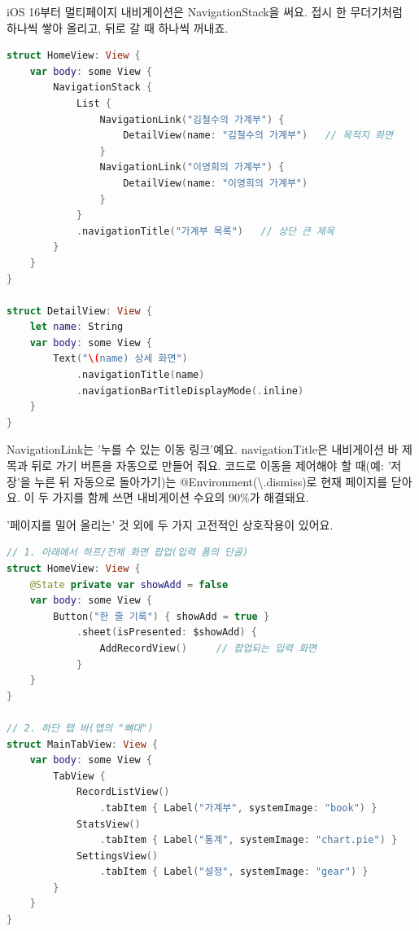
iOS 16부터 멀티페이지 내비게이션은 NavigationStack을 써요. 접시 한 무더기처럼 하나씩 쌓아 올리고, 뒤로 갈 때 하나씩 꺼내죠.

\begin{lstlisting}[language=Swift]
struct HomeView: View {
    var body: some View {
        NavigationStack {
            List {
                NavigationLink("김철수의 가계부") {
                    DetailView(name: "김철수의 가계부")   // 목적지 화면
                }
                NavigationLink("이영희의 가계부") {
                    DetailView(name: "이영희의 가계부")
                }
            }
            .navigationTitle("가계부 목록")   // 상단 큰 제목
        }
    }
}

struct DetailView: View {
    let name: String
    var body: some View {
        Text("\(name) 상세 화면")
            .navigationTitle(name)
            .navigationBarTitleDisplayMode(.inline)
    }
}
\end{lstlisting}

NavigationLink는 '누를 수 있는 이동 링크'예요. navigationTitle은 내비게이션 바 제목과 뒤로 가기 버튼을 자동으로 만들어 줘요. 코드로 이동을 제어해야 할 때(예: '저장'을 누른 뒤 자동으로 돌아가기)는 @Environment(\textbackslash{}.dismiss)로 현재 페이지를 닫아요. 이 두 가지를 함께 쓰면 내비게이션 수요의 90\%가 해결돼요.


'페이지를 밀어 올리는' 것 외에 두 가지 고전적인 상호작용이 있어요.

\begin{lstlisting}[language=Swift]
// 1. 아래에서 하프/전체 화면 팝업(입력 폼의 단골)
struct HomeView: View {
    @State private var showAdd = false
    var body: some View {
        Button("한 줄 기록") { showAdd = true }
            .sheet(isPresented: $showAdd) {
                AddRecordView()     // 팝업되는 입력 화면
            }
    }
}

// 2. 하단 탭 바(앱의 "뼈대")
struct MainTabView: View {
    var body: some View {
        TabView {
            RecordListView()
                .tabItem { Label("가계부", systemImage: "book") }
            StatsView()
                .tabItem { Label("통계", systemImage: "chart.pie") }
            SettingsView()
                .tabItem { Label("설정", systemImage: "gear") }
        }
    }
}
\end{lstlisting}

